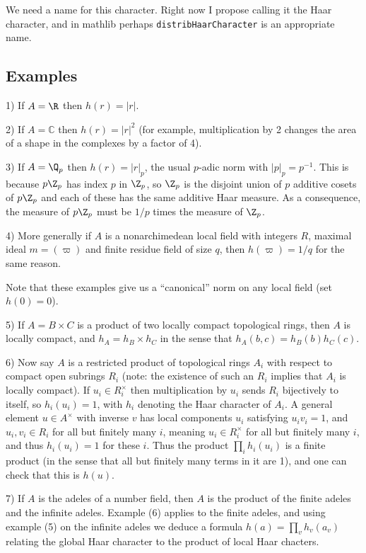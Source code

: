 We need a name for this character. Right now I propose calling it the Haar character,
and in mathlib perhaps {\tt distribHaarCharacter} is an appropriate name.

\subsection{Examples}

1) If $A=\R$ then $h(r)=|r|$.

2) If $A=\mathbb{C}$ then $h(r)=|r|^2$ (for example, multiplication by 2 changes the area
of a shape in the complexes by a factor of 4).

3) If $A=\Q_p$ then $h(r)=|r|_p$, the usual $p$-adic norm with $|p|_p=p^{-1}$.
This is because $p\Z_p$ has index $p$ in $\Z_p$, so $\Z_p$ is the disjoint union
of $p$ additive cosets of $p\Z_p$ and each of these has the same additive Haar measure.
As a consequence, the measure of $p\Z_p$ must be $1/p$ times the measure of $\Z_p$.

4) More generally if $A$ is a nonarchimedean local field with integers $R$,
maximal ideal $m=(\varpi)$ and finite residue field of size $q$, then $h(\varpi)=1/q$
for the same reason.

Note that these examples give us a ``canonical'' norm on any local field (set $h(0)=0$).

5) If $A=B\times C$ is a product of two locally compact topological rings, then $A$
is locally compact, and $h_A=h_B\times h_C$ in the sense that $h_A(b,c)=h_B(b)h_C(c)$.

6) Now say $A$ is a restricted product of topological rings $A_i$ with respect to compact
open subrings $R_i$ (note: the existence of such an $R_i$ implies that $A_i$ is
locally compact). If $u_i\in R_i^\times$ then multiplication by $u_i$ sends $R_i$
bijectively to itself, so $h_i(u_i)=1$, with $h_i$ denoting the Haar character of $A_i$.
A general element $u\in A^\times$ with inverse $v$
has local components $u_i$ satisfying $u_iv_i=1$, and $u_i,v_i\in R_i$ for all but
finitely many $i$, meaning $u_i\in R_i^\times$ for all but finitely many $i$, and thus
$h_i(u_i)=1$ for these $i$. Thus the product $\prod_i h_i(u_i)$ is a finite product
(in the sense that all but finitely many terms in it are 1), and one can check
that this is $h(u)$.

7) If $A$ is the adeles of a number field, then $A$ is the product of the finite adeles
and the infinite adeles. Example (6) applies to the finite adeles, and using example (5)
on the infinite adeles we deduce a formula $h(a)=\prod_v h_v(a_v)$ relating the global
Haar character to the product of local Haar chacters.

